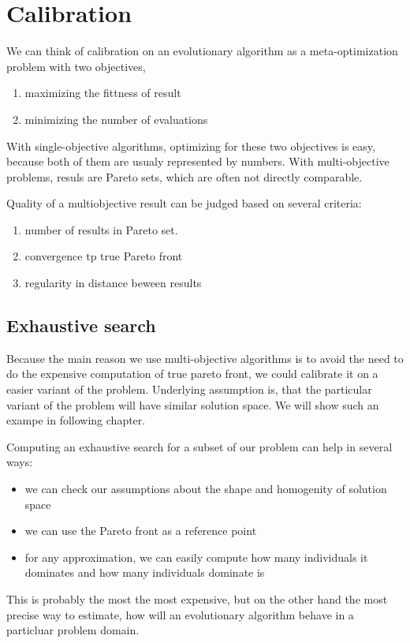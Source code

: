 \documentclass[12pt,oneside]{fithesis2}
\begin{document}
\chapter{Calibration}

We can think of calibration on an evolutionary algorithm as a meta-optimization problem with two objectives, 

\begin{enumerate}
\item maximizing the fittness of result
\item minimizing the number of evaluations
\end{enumerate}
With single-objective algorithms, optimizing for these two objectives is easy, because both of them are usualy represented by numbers.
With multi-objective problems, resuls are Pareto sets, which are often not directly comparable.

Quality of a multiobjective result can be judged based on several criteria:
\begin{enumerate}
\item number of results in Pareto set.
\item convergence tp true Pareto front
\item regularity in distance beween results
\end{enumerate}


\section{Exhaustive search}
Because the main reason we use multi-objective algorithms is to avoid the need to do the expensive computation of true pareto front,
we could calibrate it on a easier variant of the problem. Underlying assumption is, that the particular variant of the problem will have similar solution space. We will show such an exampe in following chapter.

Computing an exhaustive search for a subset of our problem can help in several ways:
\begin{itemize}
  \item we can check our assumptions about the shape and homogenity of solution space
  \item we can use the Pareto front as a reference point
  \item for any approximation, we can easily compute how many individuals it dominates and how many individuals dominate is
\end{itemize}

This is probably the most the most expensive, but on the other hand the most precise way to estimate, how will an evolutionary algorithm behave in a particluar problem domain.
\end{document}
